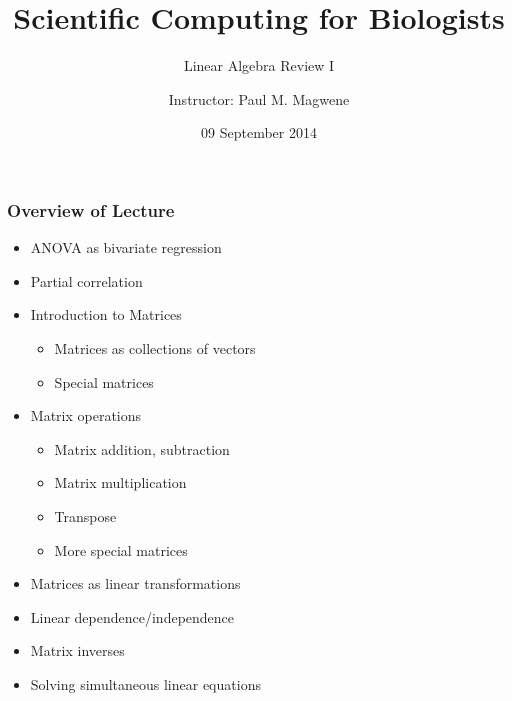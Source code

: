 \documentclass{beamer}
\title{Scientific Computing for Biologists}
\subtitle{Linear Algebra Review I} %
\author{Instructor: Paul M. Magwene}
\date{09 September 2014}
\begin{document}
\begin{frame}
\titlepage
\end{frame}

\begin{frame}
  \frametitle{Overview of Lecture}
  
\begin{itemize}
        \item ANOVA as bivariate regression
        \item Partial correlation
	\item Introduction to Matrices
		\begin{itemize}
			\item Matrices as collections of vectors
			\item Special matrices
		\end{itemize}
		\item Matrix operations
		\begin{itemize}
			\item Matrix addition, subtraction
			\item Matrix multiplication
		  \item Transpose			
		  \item More special matrices		  
		\end{itemize}		
	  \item Matrices as linear transformations		
		\item Linear dependence/independence
		\item Matrix inverses		
		\item Solving simultaneous linear equations
\end{itemize}

\end{frame}
\end{document}
